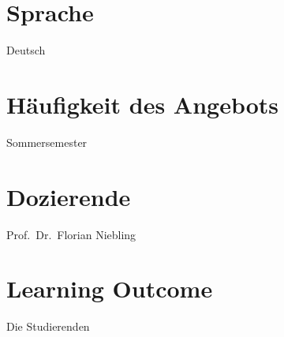 \hypertarget{sprachepathlabel....srcmodulbeschreibungen-bachelor-bpo5ba_visual-computing}{%
\section*{Sprache\label{../../src/modulbeschreibungen-bachelor-bpo5/BA_Visual-Computing}}\label{sprachepathlabel....srcmodulbeschreibungen-bachelor-bpo5ba_visual-computing}}

Deutsch

\hypertarget{huxe4ufigkeit-des-angebotspathlabel....srcmodulbeschreibungen-bachelor-bpo5ba_visual-computing}{%
\section*{Häufigkeit des
Angebots\label{../../src/modulbeschreibungen-bachelor-bpo5/BA_Visual-Computing}}\label{huxe4ufigkeit-des-angebotspathlabel....srcmodulbeschreibungen-bachelor-bpo5ba_visual-computing}}

Sommersemester

\hypertarget{dozierendepathlabel....srcmodulbeschreibungen-bachelor-bpo5ba_visual-computing}{%
\section*{Dozierende\label{../../src/modulbeschreibungen-bachelor-bpo5/BA_Visual-Computing}}\label{dozierendepathlabel....srcmodulbeschreibungen-bachelor-bpo5ba_visual-computing}}

Prof.~Dr.~Florian Niebling

\hypertarget{learning-outcomepathlabel....srcmodulbeschreibungen-bachelor-bpo5ba_visual-computing}{%
\section*{Learning
Outcome\label{../../src/modulbeschreibungen-bachelor-bpo5/BA_Visual-Computing}}\label{learning-outcomepathlabel....srcmodulbeschreibungen-bachelor-bpo5ba_visual-computing}}

Die Studierenden

